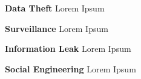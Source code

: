 %
%
%
\textbf{Data Theft}
Lorem Ipsum



%
%
%
%
\textbf{Surveillance}
Lorem Ipsum



%
%
%
\textbf{Information Leak}
Lorem Ipsum



%
%
%
\textbf{Social Engineering}
Lorem Ipsum





